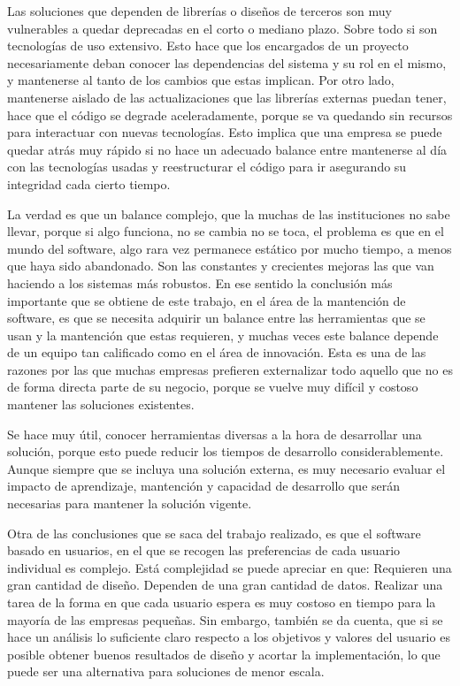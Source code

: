     \par Las soluciones que dependen de librerías o diseños de terceros son muy vulnerables a quedar deprecadas en el corto o mediano plazo. Sobre todo si son tecnologías de uso extensivo. Esto hace que los encargados de un proyecto necesariamente deban conocer las dependencias del sistema y su rol en el mismo, y mantenerse al tanto de los cambios que estas implican. Por otro lado, mantenerse aislado de las actualizaciones que las librerías externas puedan tener, hace que el código se degrade aceleradamente, porque se va quedando sin recursos para interactuar con nuevas tecnologías. Esto implica que una empresa se puede quedar atrás muy rápido si no hace un adecuado balance entre mantenerse al día con las tecnologías usadas y reestructurar el código para ir asegurando su integridad cada cierto tiempo.
    \par La verdad es que un balance complejo, que la muchas de las instituciones no sabe llevar, porque si algo funciona, no se cambia no se toca, el problema es que en el mundo del software, algo rara vez permanece estático por mucho tiempo, a menos que haya sido abandonado. Son las constantes y crecientes mejoras las que van haciendo a los sistemas más robustos. En ese sentido la conclusión más importante que se obtiene de este trabajo, en el área de la mantención de software, es que se necesita adquirir un balance entre las herramientas que se usan y la mantención que estas requieren, y muchas veces este balance depende de un equipo tan calificado como en el área de innovación. Esta es una de las razones por las que muchas empresas prefieren externalizar todo aquello que no es de forma directa parte de su negocio, porque se vuelve muy difícil y costoso mantener las soluciones existentes.

    \par Se hace muy útil, conocer herramientas diversas a la hora de desarrollar una solución, porque esto puede reducir los tiempos de desarrollo considerablemente. Aunque siempre que se incluya una solución externa, es muy necesario evaluar el impacto de aprendizaje, mantención y capacidad de desarrollo que serán necesarias para mantener la solución vigente.

    \par Otra de las conclusiones que se saca del trabajo realizado, es que el software basado en usuarios, en el que se recogen las preferencias de cada usuario individual es complejo. Está complejidad se puede apreciar en que: Requieren una gran cantidad de diseño. Dependen de una gran cantidad de datos. Realizar una tarea de la forma en que cada usuario espera es muy costoso en tiempo para la mayoría de las empresas pequeñas. Sin embargo, también se da cuenta, que si se hace un análisis lo suficiente claro respecto a los objetivos y valores del usuario es posible obtener buenos resultados de diseño y acortar la implementación, lo que puede ser una alternativa para soluciones de menor escala.

